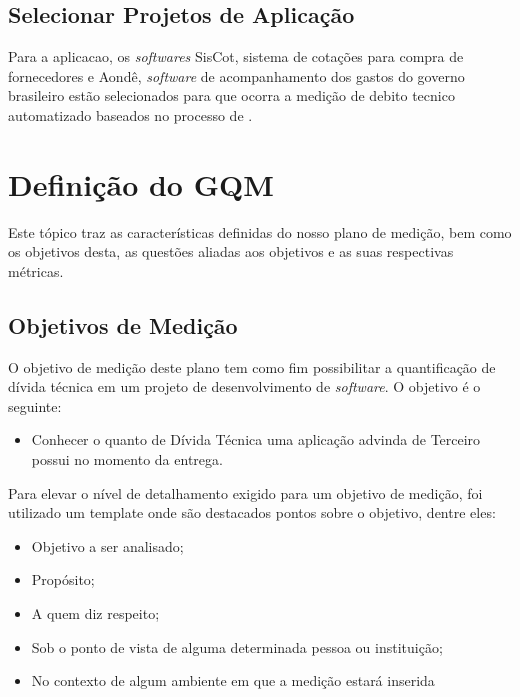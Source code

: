 \subsection{Selecionar Projetos de Aplicação}
Para a aplicacao, os \textit{softwares} SisCot, sistema de cotações para compra de fornecedores e Aondê, \textit{software}
de acompanhamento dos gastos do governo brasileiro estão selecionados para que ocorra a medição
de debito tecnico automatizado baseados no processo de \cite{td}.









\section{Definição do GQM}
Este tópico traz as características definidas do nosso plano de medição, bem como
os objetivos desta, as questões aliadas aos objetivos e as suas respectivas métricas.
\subsection{Objetivos de Medição}
O objetivo de medição deste plano tem como fim possibilitar a quantificação de
dívida técnica em um projeto de desenvolvimento de \textit{software}. O objetivo é o
seguinte:

\begin{itemize}
  \item Conhecer o quanto de Dívida Técnica uma aplicação advinda de Terceiro
  possui no momento da entrega.
\end{itemize}

Para elevar o nível de detalhamento exigido para um objetivo de medição, foi
utilizado um template onde são destacados pontos sobre o objetivo, dentre eles:

\begin{itemize}
  \item Objetivo a ser analisado;
  \item Propósito;
  \item A quem diz respeito;
  \item Sob o ponto de vista de alguma determinada pessoa ou instituição;
  \item No contexto de algum ambiente em que a medição estará inserida
\end{itemize}

